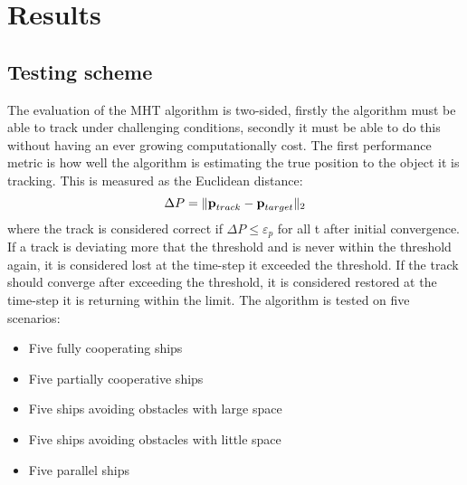 \section{Results}
\label{sec:results}

\subsection{Testing scheme}
The evaluation of the MHT algorithm is two-sided, firstly the algorithm must be able to track under challenging conditions, secondly it must be able to do this without having an ever growing computationally cost. The first performance metric is how well the algorithm is estimating the true position to the object it is tracking. This is measured as the Euclidean distance:
\begin{equation}
	\Delta P = \| \boldsymbol{\mathbf{p}}_{track}-\boldsymbol{\mathbf{p}}_{target} \|_2
\end{equation}
where the track is considered correct if $\Delta P \leq	\varepsilon_p$ for all t after initial convergence. If a track is deviating more that the threshold and is never within the threshold again, it is considered lost at the time-step it exceeded the threshold. If the track should converge after exceeding the threshold, it is considered restored at the time-step it is returning within the limit. The algorithm is tested on five scenarios:
\begin{itemize}
	\item Five fully cooperating ships
    \item Five partially cooperative ships
    \item Five ships avoiding obstacles with large space
    \item Five ships avoiding obstacles with little space
	\item Five parallel ships
\end{itemize}

